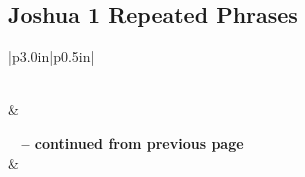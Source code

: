 \subsection{Joshua 1 Repeated Phrases}


\normalsize
 
\begin{center}
\begin{longtable}{|p{3.0in}|p{0.5in}|}
\caption[Joshua 1 Repeated Phrases]{Joshua 1 Repeated Phrases}\label{table:Repeated Phrases Joshua 1} \\
\hline {} &  \\ \hline 
\endfirsthead
 
{{\bfseries \tablename\ \thetable{} -- continued from previous page}} \\  
\hline {} &  \\ \hline 
\endhead
 

\end{longtable}
\end{center}
